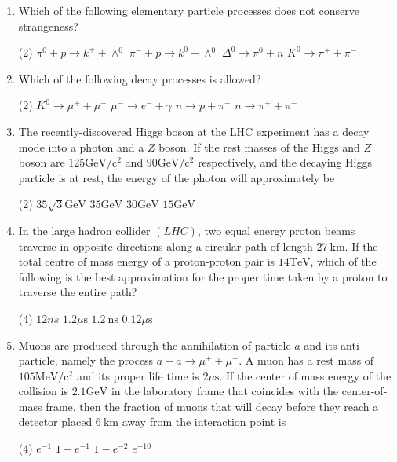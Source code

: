 \begin{enumerate}
	\item  Which of the following elementary particle processes does not conserve strangeness?
	{}
	 \begin{tasks}(2)
		\task[\textbf{a.}]$\pi^0+p \rightarrow k^{+}+\wedge^0$
		\task[\textbf{b.}]$\pi^{-}+p \rightarrow k^0+\wedge^0$
		\task[\textbf{c.}]$\Delta^0 \rightarrow \pi^0+n$
		\task[\textbf{d.}] $K^0 \rightarrow \pi^{+}+\pi^{-}$
	\end{tasks}

	\item  Which of the following decay processes is allowed?
	 \begin{tasks}(2)
		\task[\textbf{a.}]$K^0 \rightarrow \mu^{+}+\mu^{-}$
		\task[\textbf{b.}] $\mu^{-} \rightarrow e^{-}+\gamma$
		\task[\textbf{c.}]$n \rightarrow p+\pi^{-}$
		\task[\textbf{d.}] $n \rightarrow \pi^{+}+\pi^{-}$
	\end{tasks}

	\item  The recently-discovered Higgs boson at the LHC experiment has a decay mode into a photon and a $Z$ boson. If the rest masses of the Higgs and $Z$ boson are $125 \mathrm{GeV} / \mathrm{c}^2$ and $90 \mathrm{GeV} / \mathrm{c}^2$ respectively, and the decaying Higgs particle is at rest, the energy of the photon will approximately be
	{}
	 \begin{tasks}(2)
		\task[\textbf{a.}] $35 \sqrt{3} \mathrm{GeV}$
		\task[\textbf{b.}]$35 \mathrm{GeV}$
		\task[\textbf{c.}] $30 \mathrm{GeV}$
		\task[\textbf{d.}] $15 \mathrm{GeV}$
	\end{tasks}

	\item  In the large hadron collider $(L H C)$, two equal energy proton beams traverse in opposite directions along a circular path of length $27 \mathrm{~km}$. If the total centre of mass energy of a proton-proton pair is $14 \mathrm{TeV}$, which of the following is the best approximation for the proper time taken by a proton to traverse the entire path?
	{}
	 \begin{tasks}(4)
		\task[\textbf{a.}]$12 n s$
		\task[\textbf{b.}]$1.2 \mu \mathrm{s}$
		\task[\textbf{c.}]$1.2 \mathrm{~ns}$
		\task[\textbf{d.}] $0.12 \mu \mathrm{s}$ 
	\end{tasks}

	\item  Muons are produced through the annihilation of particle $a$ and its anti-particle, namely the process $a+\bar{a} \rightarrow \mu^{+}+\mu^{-}$. A muon has a rest mass of $105 \mathrm{MeV} / \mathrm{c}^2$ and its proper life time is $2 \mu \mathrm{s}$. If the center of mass energy of the collision is $2.1 \mathrm{GeV}$ in the laboratory frame that coincides with the center-of-mass frame, then the fraction of muons that will decay before they reach a detector placed $6 \mathrm{~km}$ away from the interaction point is
	{}
	 \begin{tasks}(4)
		\task[\textbf{a.}]$e^{-1}$
		\task[\textbf{b.}]$1-e^{-1}$
		\task[\textbf{c.}] $1-e^{-2}$
		\task[\textbf{d.}]  $e^{-10}$
	\end{tasks}


\end{enumerate}
